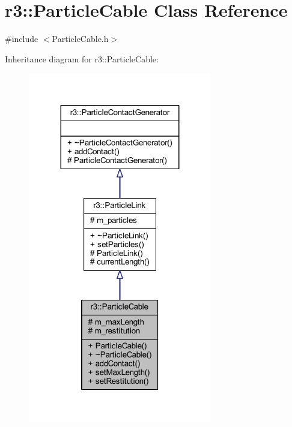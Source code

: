 \hypertarget{classr3_1_1_particle_cable}{}\section{r3\+:\+:Particle\+Cable Class Reference}
\label{classr3_1_1_particle_cable}


{\ttfamily \#include $<$Particle\+Cable.\+h$>$}



Inheritance diagram for r3\+:\+:Particle\+Cable\+:\nopagebreak
\begin{figure}[H]
\begin{center}
\leavevmode
\includegraphics[width=227pt]{classr3_1_1_particle_cable__inherit__graph}
\end{center}
\end{figure}


